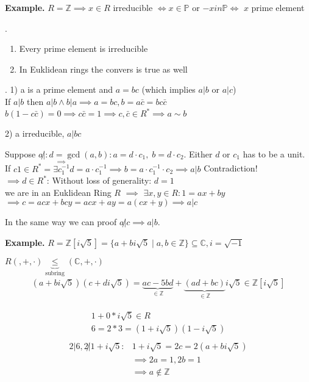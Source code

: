 \textbf{Example.}
$R = \mathbb{Z} \implies x \in R$ irreducible $\iff x \in \mathbb{P}$ or $-xin \mathbb{P} \iff $ $x$ prime element

\Theorem.
\begin{enumerate}
  \item Every prime element is irreducible
  \item In Euklidean rings the convers is true as well
\end{enumerate}

\Proof.
1) a is a prime element and $a = bc$ (which implies $a |b$ or $a|c$)\\
If $a|b$ then $a|b \land b|a \implies a = bc, b = a\bar{c} = b c\bar{c}$\\
$b(1-c\bar{c}) = 0 \implies c\bar{c} = 1 \implies c, \bar{c} \in R^{*} 
\implies a \sim b$

2) a irreducible, $a|bc$ 

Suppose $a \not|: d = \gcd(a,b): a = d\cdot c_1,\; b = d\cdot c_2$.
Either $d$ or $c_1$ has to be a unit. 
If $c1 \in R^{*} = \stackrel{\implies}{\exists c_1^{-1}} d = a\cdot c_1^{-1} \implies b = a \cdot c_1^{-1} \cdot c_2 \implies a |b$ Contradiction! \\
$\implies d \in R^{*}$: 
Without loss of generality: $d = 1$\\
we are in an Euklidean Ring $R$ $\implies$ $\exists x,y \in R: 1 = ax + by$ \\
$\implies c = acx + bcy = acx + ay = a (cx+y) \implies a|c$

In the same way we can proof $a\not|c \implies a|b$.

\textbf{Example.}
$R = \mathbb{Z} [i \sqrt{5}] = \{a+bi \sqrt{5} \mid a,b \in \mathbb{Z} \} \subseteq \mathbb{C}, i = \sqrt{-1}$

$R(,+,\cdot) \underbrace{\leq}_{\text{subring}} (\mathbb{C}, +,\cdot)$
\begin{align*}
  (a+bi \sqrt{5}) (c+di\sqrt{5}) = 
    \underbrace{ac - 5bd}_{\in \mathbb{Z}} + \underbrace{(ad+bc)}_{\in \mathbb{Z}} i\sqrt{5} \in \mathbb{Z}[i\sqrt{5}]
\end{align*}

\begin{align*}
  1+0 * i\sqrt{5} \in R\\
  6 = 2*3 = (1+i\sqrt{5})(1-i\sqrt{5})\\
\end{align*}
\begin{align*}
  2|6, 2 \not| 1+i\sqrt{5}: & 1+i\sqrt{5} = 2c = 2(a+bi\sqrt{5}) \\
    & \implies 2a = 1, 2b = 1 \\
    & \implies a \not\in \mathbb{Z}
\end{align*}

